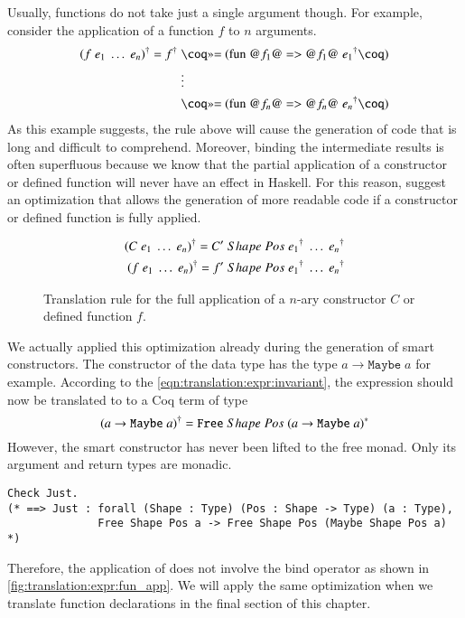 Usually, functions do not take just a single argument though.
For example, consider the application of a function $f$ to $n$ arguments.
\begin{align*}
  \toCoq{(f\;e_1\;\ldots\;e_n)}
    = \toCoq{f}\;&\coqM{>>= (fun @$f_1$@ => @$f_1$@}\;\toCoq{e_1}\coqM{)} \\
                 &\vdots                                                  \\
                 &\coqM{>>= (fun @$f_n$@ => @$f_n$@}\;\toCoq{e_n}\coqM{)}
\end{align*}
As this example suggests, the rule above will cause the generation of code that is long and difficult to comprehend.
Moreover, binding the intermediate results is often superfluous because we know that the partial application of a constructor or defined function will never have an effect in Haskell.
For this reason, \cite{Abel:2005} suggest an optimization that allows the generation of more readable code if a constructor or defined function is fully applied.
\begin{figure}[H]
  \begin{align*}
    {(C\;e_1\;\ldots\;e_n)}^{\dagger} = C'\;Shape\;Pos\;{e_1}^{\dagger}\;\ldots\;{e_n}^{\dagger} \\
    {(f\;e_1\;\ldots\;e_n)}^{\dagger} = f'\;Shape\;Pos\;{e_1}^{\dagger}\;\ldots\;{e_n}^{\dagger}
  \end{align*}
  \caption{Translation rule for the full application of a $n$-ary constructor $C$ or defined function $f$.}
  \label{fig:translation:expr:fun_app}
\end{figure}

We actually applied this optimization already during the generation of smart constructors.
The constructor  of the  data type has the type $a \rightarrow \texttt{Maybe}\;a$ for example.
According to the \ref{eqn:translation:expr:invariant}, the expression  should now be translated to to a Coq term of type
\[
  {(a \rightarrow \texttt{Maybe}\;a)}^{\dagger}
    = {\texttt{Free}}\;Shape\;Pos\;{{(a \rightarrow \texttt{Maybe}\;a)}^{*}}
\]
However, the smart constructor  has never been lifted to the free monad.
Only its argument and return types are monadic.
\begin{verbatim}
Check Just.
(* ==> Just : forall (Shape : Type) (Pos : Shape -> Type) (a : Type),
              Free Shape Pos a -> Free Shape Pos (Maybe Shape Pos a) *)
\end{verbatim}
Therefore, the application of  does not involve the bind operator as shown in \autoref{fig:translation:expr:fun_app}.
We will apply the same optimization when we translate function declarations in the final section of this chapter.


